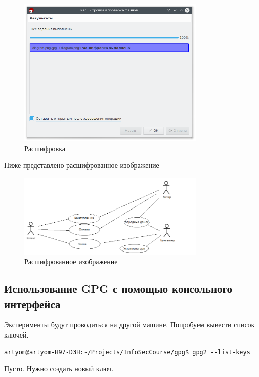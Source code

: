 \begin{figure}[H]
	\centering
	\includegraphics[width=0.8\textwidth]{figures/screen16.png}
	\caption{Расшифровка}
\end{figure}

Ниже представлено расшифрованное изображение

\begin{figure}[H]
	\centering
	\includegraphics[width=0.8\textwidth]{figures/diagram.png}
	\caption{Расшифрованное изображение}
\end{figure}

\subsection{Использование GPG с помощью консольного интерфейса}

Эксперименты будут проводиться на другой машине. Попробуем вывести список ключей.

\begin{lstlisting}  
artyom@artyom-H97-D3H:~/Projects/InfoSecCourse/gpg$ gpg2 --list-keys
\end{lstlisting}

Пусто. Нужно создать новый ключ.

